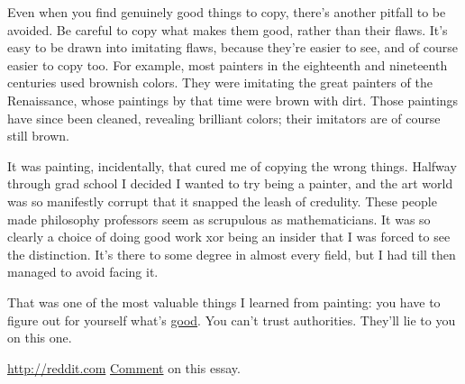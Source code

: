Even
                  when you find genuinely good things to copy, there's another
                  pitfall to be avoided. Be careful to copy what makes them
                  good, rather than their flaws. It's easy to be drawn into
                  imitating flaws, because they're easier to see, and of course
                  easier to copy too. For example, most painters in the
                  eighteenth and nineteenth centuries used brownish colors. They
                  were imitating the great painters of the Renaissance, whose
                  paintings by that time were brown with dirt. Those paintings
                  have since been cleaned, revealing brilliant colors; their
                  imitators are of course still brown.

It was
                  painting, incidentally, that cured me of copying the wrong
                  things. Halfway through grad school I decided I wanted to try
                  being a painter, and the art world was so manifestly corrupt
                  that it snapped the leash of credulity. These people made
                  philosophy professors seem as scrupulous as mathematicians. It
                  was so clearly a choice of doing good work xor being an
                  insider that I was forced to see the distinction. It's there
                  to some degree in almost every field, but I had till then
                  managed to avoid facing it.

That was one of the
                  most valuable things I learned from painting: you have to
                  figure out for yourself what's \href{http://www.paulgraham.com/taste.html}{good}.
                  You can't trust authorities. They'll lie to you on this
                  one.





\href{http://reddit.com}{http://reddit.com}
                  \href{http://reddit.com/info/9bm4/comments}{ Comment} on
                  this essay.



              
            
          

